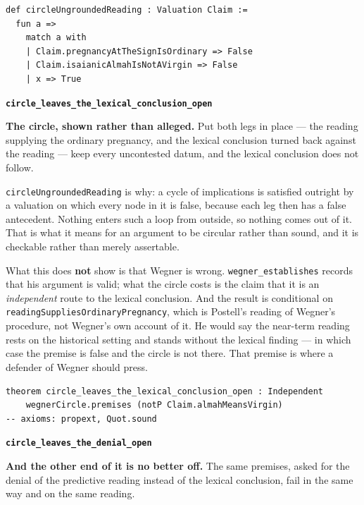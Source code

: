 \documentclass[11pt]{article}
\begin{document}
{\small\begin{verbatim}
def circleUngroundedReading : Valuation Claim :=
  fun a =>
    match a with
    | Claim.pregnancyAtTheSignIsOrdinary => False
    | Claim.isaianicAlmahIsNotAVirgin => False
    | x => True
\end{verbatim}}
\par\medskip\noindent\textbf{\texttt{circle\_\allowbreak{}leaves\_\allowbreak{}the\_\allowbreak{}lexical\_\allowbreak{}conclusion\_\allowbreak{}open}}\par\nobreak\noindent
\textbf{The circle, shown rather than alleged.} Put both legs in place — the reading supplying the ordinary pregnancy, and the lexical conclusion turned back against the reading — keep every uncontested datum, and the lexical conclusion does not follow.

\texttt{circle\allowbreak{}Ungrounded\allowbreak{}Reading} is why: a cycle of implications is satisfied outright by a valuation on which every node in it is false, because each leg then has a false antecedent. Nothing enters such a loop from outside, so nothing comes out of it. That is what it means for an argument to be circular rather than sound, and it is checkable rather than merely assertable.

What this does \textbf{not} show is that Wegner is wrong. \texttt{wegner\_\allowbreak{}establishes} records that his argument is valid; what the circle costs is the claim that it is an \emph{independent} route to the lexical conclusion. And the result is conditional on \texttt{reading\allowbreak{}Supplies\allowbreak{}Ordinary\allowbreak{}Pregnancy}, which is Postell's reading of Wegner's procedure, not Wegner's own account of it. He would say the near-term reading rests on the historical setting and stands without the lexical finding — in which case the premise is false and the circle is not there. That premise is where a defender of Wegner should press.

{\small\begin{verbatim}
theorem circle_leaves_the_lexical_conclusion_open : Independent
    wegnerCircle.premises (notP Claim.almahMeansVirgin)
-- axioms: propext, Quot.sound
\end{verbatim}}
\par\medskip\noindent\textbf{\texttt{circle\_\allowbreak{}leaves\_\allowbreak{}the\_\allowbreak{}denial\_\allowbreak{}open}}\par\nobreak\noindent
\textbf{And the other end of it is no better off.} The same premises, asked for the denial of the predictive reading instead of the lexical conclusion, fail in the same way and on the same reading.
\end{document}
